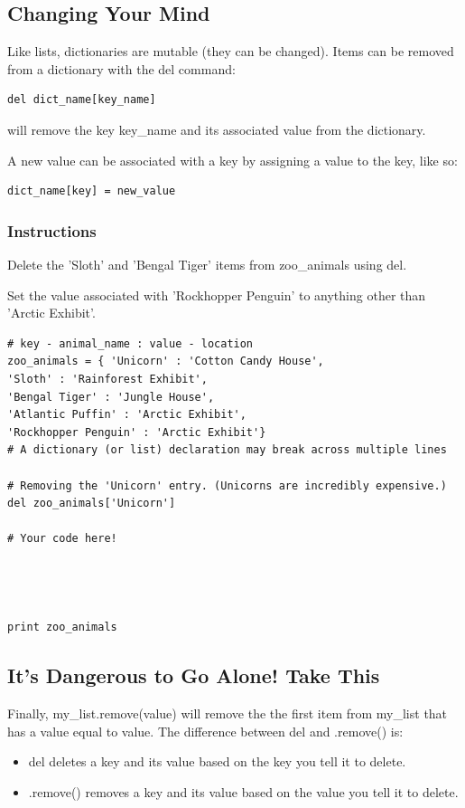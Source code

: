 \documentclass[12pt,a4paper,final,twoside,onecolumn,titlepage]{book}
\begin{document}
\subsection{Changing Your Mind}

Like lists, dictionaries are mutable (they can be changed). Items can be removed from a dictionary with the del command:
\begin{lstlisting}
del dict_name[key_name]
\end{lstlisting}
will remove the key key\_name and its associated value from the dictionary.

A new value can be associated with a key by assigning a value to the key, like so:
\begin{lstlisting}
dict_name[key] = new_value
\end{lstlisting}
\subsubsection{Instructions}

Delete the 'Sloth' and 'Bengal Tiger' items from zoo\_animals using del.

Set the value associated with 'Rockhopper Penguin' to anything other than 'Arctic Exhibit'.
\begin{lstlisting}
# key - animal_name : value - location 
zoo_animals = { 'Unicorn' : 'Cotton Candy House',
'Sloth' : 'Rainforest Exhibit',
'Bengal Tiger' : 'Jungle House',
'Atlantic Puffin' : 'Arctic Exhibit',
'Rockhopper Penguin' : 'Arctic Exhibit'}
# A dictionary (or list) declaration may break across multiple lines

# Removing the 'Unicorn' entry. (Unicorns are incredibly expensive.)
del zoo_animals['Unicorn']

# Your code here!




print zoo_animals
\end{lstlisting}

\subsection{It's Dangerous to Go Alone! Take This}

Finally, my\_list.remove(value) will remove the the first item from my\_list that has a value equal to value. The difference between del and .remove() is:
\begin{itemize}
\item    del deletes a key and its value based on the key you tell it to delete.
\item    .remove() removes a key and its value based on the value you tell it to delete.
\end{itemize}
\end{document}
